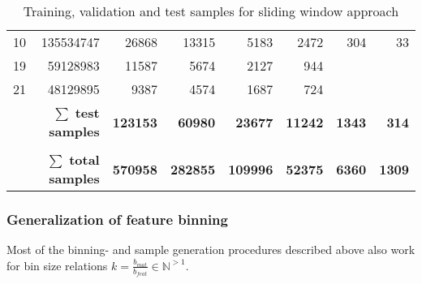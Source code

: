\begin{table}[hbp]
\begin{tabular}{lrrrrrrr}
10                                                       & 135534747                                               & 26868                  & 13315                   & 5183                    & 2472                    & 304                      & 33                       \\
19                                                       & 59128983                                                & 11587                  & 5674                    & 2127                    & 944                     &                          &                          \\
21                                                       & 48129895                                                & 9387                   & 4574                    & 1687                    & 724                     &                          &                          \\
\multicolumn{2}{r}{$\mathbf{\sum}$ \textbf{test samples}}                                                                          & \textbf{123153}        & \textbf{60980}          & \textbf{23677}          & \textbf{11242}          & \textbf{1343}            & \textbf{314}             \\
                                                         &                                                         & \multicolumn{1}{l}{}   & \multicolumn{1}{l}{}    & \multicolumn{1}{l}{}    & \multicolumn{1}{l}{}    & \multicolumn{1}{l}{}     & \multicolumn{1}{l}{}     \\
\multicolumn{2}{r}{$\mathbf{\sum}$ \textbf{total samples}}                                                                         & \textbf{570958}        & \textbf{282855}         & \textbf{109996}         & \textbf{52375}          & \textbf{6360}            & \textbf{1309}            \\ \hline
\end{tabular}
\caption{Training, validation and test samples for sliding window approach} \label{tab:methods:samples}
\end{table}

\subsubsection{Generalization of feature binning} \label{sec:methods:inputBinning}
Most of the binning- and sample generation procedures described above 
also work for bin size relations $k=\frac{b_\mathit{mat}}{b_\mathit{feat}} \in \mathbb{N}^{>1}$.

